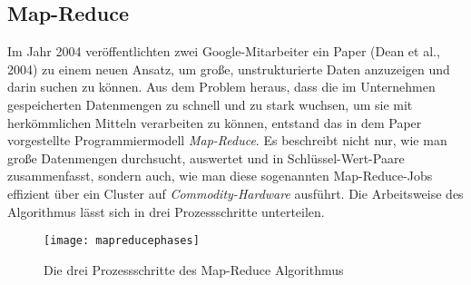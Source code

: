 \subsection{Map-Reduce}
\label{subsec:mapreduce}

Im Jahr 2004 veröffentlichten zwei Google-Mitarbeiter ein Paper (Dean et al., 2004) zu einem neuen Ansatz, um große, unstrukturierte Daten anzuzeigen und darin suchen zu können. Aus dem Problem heraus, dass die im Unternehmen gespeicherten Datenmengen zu schnell und zu stark wuchsen, um sie mit herkömmlichen Mitteln verarbeiten zu können, entstand das in dem Paper vorgestellte Programmiermodell \textit{Map-Reduce}. Es beschreibt nicht nur, wie man große Datenmengen durchsucht, auswertet und in Schlüssel-Wert-Paare zusammenfasst, sondern auch, wie man diese sogenannten Map-Reduce-Jobs effizient über ein Cluster auf \textit{Commodity-Hardware} ausführt. Die Arbeitsweise des Algorithmus lässt sich in drei Prozessschritte unterteilen.

\begin{figure}[!htb]
	\centering
	\texttt{[image: mapreducephases]}
	\caption{Die drei Prozessschritte des Map-Reduce Algorithmus}
	\label{img:mapreducephases}
\end{figure}
